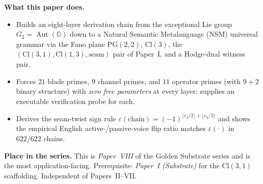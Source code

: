 \documentclass[11pt,a4paper]{article}
\theoremstyle{plain}
\theoremstyle{definition}
\theoremstyle{remark}
\numberwithin{equation}{section}
\providecommand{\Cl}{\mathrm{Cl}}
\providecommand{\OO}{\mathbb{O}}
\providecommand{\PG}{\mathrm{PG}}
\providecommand{\eps}{\varepsilon}
\DeclareMathOperator{\Aut}{Aut}
\begin{document}
\begin{abstract}
A capstone result, proved in Section~\ref{sec:combined-reading},
is the \emph{Combined Reading Lemma}: for every byte chain $c$,
the engine state $M_{31}(c) \in \Cl(3,1)$ admits a unique
orthogonal decomposition $M_{31}(c) = M_{\mathrm{fix}}(c) +
M_{\mathrm{twist}}(c)$ with
$\langle M_{\mathrm{fix}}(c), M_{\mathrm{twist}}(c) \rangle = 0$,
and the $\Cl(1,3)$ twin is $M_{13}(c) = \eps(c) \cdot M_{31}(c)$.
The seam-fixed half is read by an algebraic byte-stream engine
(the Acoustic Eversion Engine, perspective-invariant); the
seam-twisted half is acted on by the NSM operator library
(perspective-dependent); and the witness pair $(\mathsf{be},
\mathsf{know})$ is the unique chirality-invariant
grade-$0$/grade-$4$ subspace that reads both halves---the
\emph{lawful mediating third} of the engine--UG dyad.  Six probes
on real language (50 active/passive English pairs, 20 parallel
sentences across 6 language families, 10{,}000 \texttt{enwik9}
windows, 150 algebraic chains) confirm five concrete capabilities
this decomposition makes available: algebraic voice swap, a
translation-invariant 8-channel semantic Fourier readout, an
opt-in witness Born rule, a byte+atom co-stream, and an
$\eps$-based corpus signature distinguishing
$\rho_{\mathrm{enwik9}} = 0.4633$ from
$\rho_{\mathrm{NSM-bytes}} = 0.2222$.
\end{abstract}

\medskip
\noindent\textbf{What this paper does.}
\begin{itemize}[leftmargin=1.5em,nosep,topsep=2pt]
  \item Builds an eight-layer derivation chain from the
        exceptional Lie group $G_{2} = \Aut(\OO)$ down to a
        Natural Semantic Metalanguage (NSM) universal grammar via
        the Fano plane $\PG(2,2)$, $\Cl(3)$, the
        $(\Cl(3,1),\Cl(1,3),\text{seam})$ pair of Paper~I, and a
        Hodge-dual witness pair.
  \item Forces $21$ blade primes, $9$ channel primes, and
        $11$ operator primes (with $9 + 2$ binary structure) with
        \emph{zero free parameters} at every layer; supplies an
        executable verification probe for each.
  \item Derives the seam-twist sign rule
        $\eps(\text{chain}) = (-1)^{\lfloor c_2/2\rfloor + \lfloor c_3/2\rfloor}$
        and shows the empirical English active-/passive-voice
        flip ratio matches $\eps(\cdot)$ in $622/622$ chains.
\end{itemize}

\medskip
\noindent\textbf{Place in the series.}
This is \emph{Paper~VIII} of the Golden Substrate series and is
the most application-facing.  Prerequisite: \emph{Paper~I (Substrate)}
for the $\Cl(3,1)$ scaffolding.  Independent of Papers~II--VII.
\end{document}
